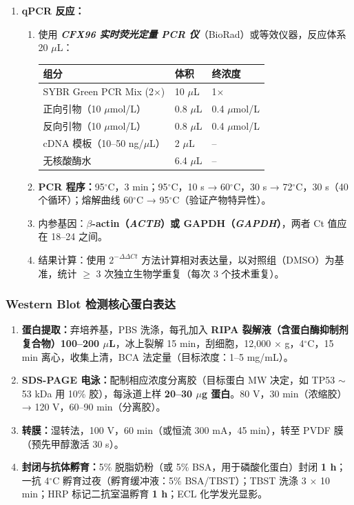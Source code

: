 \documentclass[12pt,a4paper,twoside]{article}
\newcommand{\software}[1]{\textbf{\textit{#1}}}
\newcommand{\gene}[1]{\textit{#1}}
\begin{document}
\begin{enumerate}
  \item \textbf{qPCR 反应：}
    \begin{enumerate}
      \item 使用 \software{CFX96 实时荧光定量 PCR 仪}（BioRad）或等效仪器，反应体系 20 $\mu$L：
        \begin{center}
        \begin{tabular}{lll}
        \toprule
        \textbf{组分} & \textbf{体积} & \textbf{终浓度} \\
        \midrule
        SYBR Green PCR Mix (2$\times$) & 10 $\mu$L & 1$\times$ \\
        正向引物（10 $\mu$mol/L） & 0.8 $\mu$L & 0.4 $\mu$mol/L \\
        反向引物（10 $\mu$mol/L） & 0.8 $\mu$L & 0.4 $\mu$mol/L \\
        cDNA 模板（10--50 ng/$\mu$L） & 2 $\mu$L & -- \\
        无核酸酶水 & 6.4 $\mu$L & -- \\
        \bottomrule
        \end{tabular}
        \end{center}
      \item \textbf{PCR 程序：}95$^{\circ}$C，3 min；95$^{\circ}$C，10 s → 60$^{\circ}$C，30 s → 72$^{\circ}$C，30 s（40 个循环）；熔解曲线 60$^{\circ}$C → 95$^{\circ}$C（验证产物特异性）。
      \item 内参基因：\textbf{$\beta$-actin（\gene{ACTB}）或 GAPDH（\gene{GAPDH}）}，两者 Ct 值应在 18--24 之间。
      \item 结果计算：使用 $2^{-\Delta\Delta Ct}$ 方法计算相对表达量，以对照组（DMSO）为基准，统计 $\geq$ 3 次独立生物学重复（每次 3 个技术重复）。
    \end{enumerate}
\end{enumerate}

\subsubsection{Western Blot 检测核心蛋白表达}

\begin{enumerate}
  \item \textbf{蛋白提取：}弃培养基，PBS 洗涤，每孔加入 \textbf{RIPA 裂解液（含蛋白酶抑制剂复合物）100--200 $\mu$L}，冰上裂解 15 min，刮细胞，12,000 $\times$ g，4$^{\circ}$C，15 min 离心，收集上清，BCA 法定量（目标浓度：1--5 mg/mL）。
  \item \textbf{SDS-PAGE 电泳：}配制相应浓度分离胶（目标蛋白 MW 决定，如 TP53 $\sim$ 53 kDa 用 10\% 胶），每泳道上样 \textbf{20--30 $\mu$g 蛋白}。80 V，30 min（浓缩胶）→ 120 V，60--90 min（分离胶）。
  \item \textbf{转膜：}湿转法，100 V，60 min（或恒流 300 mA，45 min），转至 PVDF 膜（预先甲醇激活 30 s）。
  \item \textbf{封闭与抗体孵育：}5\% 脱脂奶粉（或 5\% BSA，用于磷酸化蛋白）封闭 \textbf{1 h}；一抗 4$^{\circ}$C 孵育过夜（孵育缓冲液：5\% BSA/TBST）；TBST 洗涤 3 $\times$ 10 min；HRP 标记二抗室温孵育 \textbf{1 h}；ECL 化学发光显影。
\end{enumerate}
\end{document}
